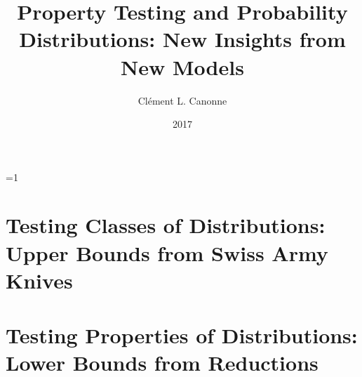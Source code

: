\documentclass[letterpaper,10pt]{memoir} %
\title{Property Testing and Probability Distributions: New Insights from New Models}
\author{Cl\'{e}ment L. Canonne}
\date{2017}
\def\withannoyingspacing{0}
\begin{document}
\footnotesep\baselineskip %
\ifnum\withannoyingspacing=1
\else
\fi
\pagestyle{plain} %


\makeatletter


\makeatother

\frontmatter
\tableofcontents %
\listoffigures







\mainmatter



\chapter{Testing Classes of Distributions: Upper Bounds from Swiss Army Knives} %


\chapter{Testing Properties of Distributions: Lower Bounds from Reductions}

\end{document}
